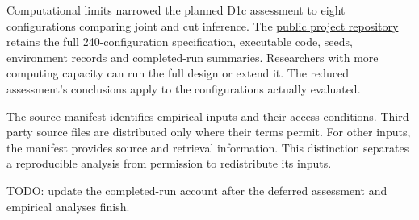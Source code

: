 \documentclass[12pt]{article}
\begin{document}
Computational limits narrowed the planned D1c assessment to eight configurations comparing joint and cut inference. The \href{https://github.com/BrettRey/marked-pole-stereotypes}{public project repository} retains the full 240-configuration specification, executable code, seeds, environment records and completed-run summaries. Researchers with more computing capacity can run the full design or extend it. The reduced assessment's conclusions apply to the configurations actually evaluated.

The source manifest identifies empirical inputs and their access conditions. Third-party source files are distributed only where their terms permit. For other inputs, the manifest provides source and retrieval information. This distinction separates a reproducible analysis from permission to redistribute its inputs.

TODO: update the completed-run account after the deferred assessment and empirical analyses finish.


\clearpage
\printbibliography
\end{document}
